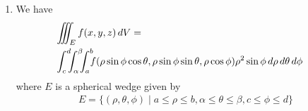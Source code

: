 \documentclass[10pt]{article}
\begin{document}
\begin{multicols}{2}
\begin{enumerate}
\begin{enumerate}
        \item We have
        \begin{align*}
        \hspace{-5mm}
            &\iiint_E f(x,y,z) \,dV = \\
        \hspace{-5mm}
            &\int_c^d \hspace{-1.8mm} \int_\alpha^\beta \hspace{-1.8mm} \int_{a}^{b} \hspace{-1.8mm} f(\rho\sin{\phi}\cos{\theta}, \rho \sin{\phi}\sin{\theta}, \rho\cos{\phi}) \rho^2 \sin{\phi} \,d\rho \,d\theta \,d\phi
        \end{align*}
        where $E$ is a spherical wedge given by 
        \begin{align*}
            E = \{ (\rho, \theta, \phi) \mid a \leq \rho \leq b, \alpha \leq \theta \leq \beta, c \leq \phi \leq d \}
        \end{align*}
    \end{enumerate}
    

\end{enumerate}
\end{multicols}
\end{document}
